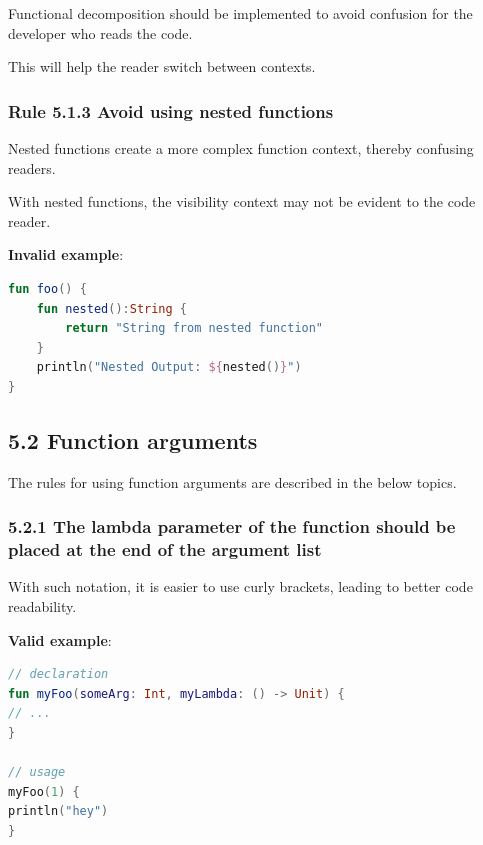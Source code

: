 {{{{Functional decomposition should be implemented to avoid confusion for the developer who reads the code.

This will help the reader switch between contexts.



\subsubsection*{\textbf{Rule 5.1.3 Avoid using nested functions}}
\leavevmode\newline

Nested functions create a more complex function context, thereby confusing readers.

With nested functions, the visibility context may not be evident to the code reader.



\textbf{Invalid example}:

\begin{lstlisting}[language=Kotlin]
fun foo() { 
    fun nested():String { 
        return "String from nested function" 
    } 
    println("Nested Output: ${nested()}") 
} 
\end{lstlisting}


\subsection*{\textbf{5.2 Function arguments}}

The rules for using function arguments are described in the below topics.

\subsubsection*{\textbf{5.2.1 The lambda parameter of the function should be placed at the end of the argument list}}
\leavevmode\newline



With such notation, it is easier to use curly brackets, leading to better code readability.



\textbf{Valid example}:

\begin{lstlisting}[language=Kotlin]
// declaration
fun myFoo(someArg: Int, myLambda: () -> Unit) {
// ...
}

// usage
myFoo(1) { 
println("hey")
}
\end{lstlisting}


}}}}
